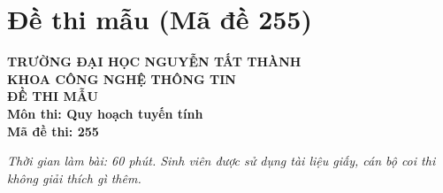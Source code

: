 \section{Đề thi mẫu (Mã đề 255)}

\begin{center}
    \textbf{\Large TRƯỜNG ĐẠI HỌC NGUYỄN TẤT THÀNH} \\
    \textbf{\large KHOA CÔNG NGHỆ THÔNG TIN} \\
    \vspace{0.3cm}
    \textbf{\Large ĐỀ THI MẪU} \\
    \textbf{Môn thi: Quy hoạch tuyến tính} \\
    \textbf{Mã đề thi: 255}
\end{center}

\vspace{0.3cm}
\noindent\textit{Thời gian làm bài: 60 phút. Sinh viên được sử dụng tài liệu giấy, cán bộ coi thi không giải thích gì thêm.}
\vspace{0.5cm}

